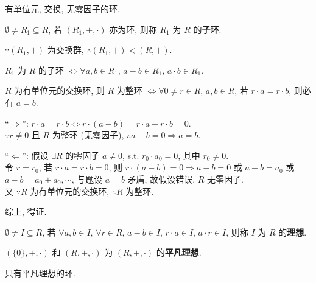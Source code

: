 \documentclass{note}
\begin{document}
\begin{df}[整环]
    有单位元, 交换, 无零因子的环.
\end{df}

\begin{df}[子环]
    $\emptyset\neq R_1\subseteq R$, 若 $(R_1,+,\cdot)$ 亦为环, 则称 $R_1$ 为 $R$ 的\textbf{子环}.
\end{df}

$\because(R_1,+)$ 为交换群, $\therefore(R_1,+)<(R,+)$.

\begin{thm}[子环的判定]
    $R_1$ 为 $R$ 的子环 $\Longleftrightarrow\forall a,b\in R_1$, $a-b\in R_1$, $a\cdot b\in R_1$.
\end{thm}

\begin{thm}
    $R$ 为有单位元的交换环, 则 $R$ 为整环 $\Longleftrightarrow\forall 0\neq r\in R$, $a,b\in R$, 若 $r\cdot a=r\cdot b$, 则必有 $a=b$.
\end{thm}
\begin{pf}
    ``$\Longrightarrow$'': $r\cdot a=r\cdot b\Longleftrightarrow r\cdot(a-b)=r\cdot a-r\cdot b=0$.\\
    $\because r\neq 0$ 且 $R$ 为整环 (无零因子), $\therefore a-b=0\Longrightarrow a=b$.

    ``$\Longleftarrow$'': 假设 $\exists R$ 的零因子 $a\neq 0$, s.t. $r_0\cdot a_0=0$, 其中 $r_0\neq 0$.\\
    令 $r=r_0$, 若 $r\cdot a=r\cdot b=0$, 则 $r\cdot(a-b)=0\Longrightarrow a-b=0$ 或 $a-b=a_0$ 或 $a-b=a_0+a_0,\cdots$, 与题设 $a=b$ 矛盾, 故假设错误, $R$ 无零因子.\\
    又 $\because R$ 为有单位元的交换环, $\therefore R$ 为整环.

    综上, 得证.
\end{pf}

\begin{df}[理想]
    $\emptyset\neq I\subseteq R$, 若 $\forall a,b\in I$, $\forall r\in R$, $a-b\in I$, $r\cdot a\in I$, $a\cdot r\in I$, 则称 $I$ 为 $R$ 的\textbf{理想}.
\end{df}

\begin{df}[平凡理想]
    $(\{0\},+,\cdot)$ 和 $(R,+,\cdot)$ 为 $(R,+,\cdot)$ 的\textbf{平凡理想}.
\end{df}

\begin{df}[单环]
    只有平凡理想的环.
\end{df}
\end{document}
